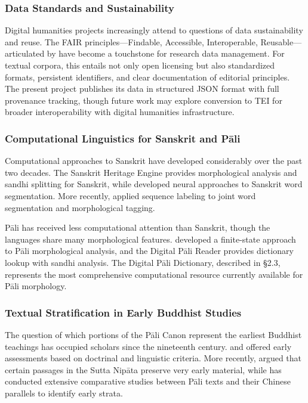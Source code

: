 \documentclass[unnumsec,webpdf,contemporary,large]{oup-authoring-template}
\begin{document}
\subsubsection{Data Standards and Sustainability}

Digital humanities projects increasingly attend to questions of data sustainability and reuse. The FAIR principles---Findable, Accessible, Interoperable, Reusable---articulated by \citet{wilkinson2016} have become a touchstone for research data management. For textual corpora, this entails not only open licensing but also standardized formats, persistent identifiers, and clear documentation of editorial principles. The present project publishes its data in structured JSON format with full provenance tracking, though future work may explore conversion to TEI for broader interoperability with digital humanities infrastructure.

\subsubsection{Computational Linguistics for Sanskrit and Pāli}

Computational approaches to Sanskrit have developed considerably over the past two decades. The Sanskrit Heritage Engine \citep{goyal2012,huet2005} provides morphological analysis and sandhi splitting for Sanskrit, while \citet{hellwig2016} developed neural approaches to Sanskrit word segmentation. More recently, \citet{krishna2018} applied sequence labeling to joint word segmentation and morphological tagging.

Pāli has received less computational attention than Sanskrit, though the languages share many morphological features. \citet{alfter2017} developed a finite-state approach to Pāli morphological analysis, and the Digital Pāli Reader \citep{yuttadhammo2013} provides dictionary lookup with sandhi analysis. The Digital Pāli Dictionary, described in §2.3, represents the most comprehensive computational resource currently available for Pāli morphology.

\subsubsection{Textual Stratification in Early Buddhist Studies}

The question of which portions of the Pāli Canon represent the earliest Buddhist teachings has occupied scholars since the nineteenth century. \citet{rhysdavids1903} and \citet{winternitz1933} offered early assessments based on doctrinal and linguistic criteria. More recently, \citet{wynne2004} argued that certain passages in the Sutta Nipāta preserve very early material, while \citet{analayo2011} has conducted extensive comparative studies between Pāli texts and their Chinese parallels to identify early strata.
\end{document}
